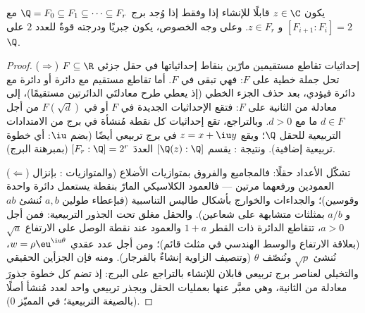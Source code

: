 \begin{theorem}[فانتزل]\label{thm:b3:galois:wantzel}
يكون $z \in \C$ قابلًا للإنشاء إذا وفقط إذا وُجد برج $\Q = F_0
\subseteq F_1 \subseteq \dots \subseteq F_r$ مع
$[F_{i+1} :
F_i] = 2$ و $z \in F_r$. وعلى وجه الخصوص، يكون  جبريًا ودرجته قوةٌ للعدد $2$ على $\Q$.
\end{theorem}

\begin{proof}
($\Rightarrow$) إحداثيات تقاطع مستقيمين مارّين بنقاط إحداثياتها
في حقل جزئي $F \subseteq \R$ تحل جملة خطية على $F$: فهي تبقى في
$F$. أما تقاطع مستقيم مع دائرة أو دائرة مع دائرة فيؤدي، بعد حذف
الجزء الخطي (إذ يعطي طرح معادلتَي الدائرتين مستقيمًا)، إلى
معادلة من  الثانية على $F$: فتقع الإحداثيات الجديدة في $F$
أو في $F(\sqrt d)$ من أجل $d \in F$ ما مع $d > 0$. وبالتراجع،
تقع إحداثيات كل نقطة مُنشأة في برج من الامتدادات التربيعية
للحقل $\Q$؛ ويقع $z = x + \iu y$ في برج تربيعي أيضًا (بضم $\iu$:
أي خطوة تربيعية إضافية). ونتيجة : يقسم $[\Q(z):\Q]$
العددَ $[F_r : \Q] = 2^r$ (بمبرهنة البرج).

($\Leftarrow$) تشكّل الأعداد  حقلًا: فالمجاميع
والفروق بمتوازيات الأضلاع (والمتوازيات : بإنزال
العمودين ورفعهما مرتين --- فالعمود الكلاسيكي المارّ بنقطة يستعمل
دائرة واحدة وقوسين)؛ والجداءات والخوارج بأشكال طاليس التناسبية
(فبإعطاء طولين $a, b$ نُنشئ $ab$ و $a/b$ بمثلثات متشابهة على
شعاعين). والحقل مغلق تحت الجذور التربيعية: فمن أجل $a > 0$،
تتقاطع الدائرة ذات القطر $1 + a$ والعمود عند نقطة الوصل على
الارتفاع $\sqrt a$ (بعلاقة الارتفاع والوسط الهندسي في مثلث
قائم)؛ ومن أجل عدد عقدي $w = \rho\eu^{\iu\theta}$، نُنشئ $\sqrt\rho$ ونُنصّف
$\theta$ (وتنصيف الزاوية إنشاءٌ بالفرجار). ومنه فإن الجزأين
الحقيقي والتخيلي لعناصر برج تربيعي قابلان للإنشاء بالتراجع على
البرج: إذ تضم كل خطوة جذورَ معادلة من  الثانية، وهي
معبَّر عنها بعمليات الحقل وبجذر تربيعي واحد لعدد مُنشأ أصلًا
(بالصيغة التربيعية؛ في المميّز $0$).
\end{proof}

